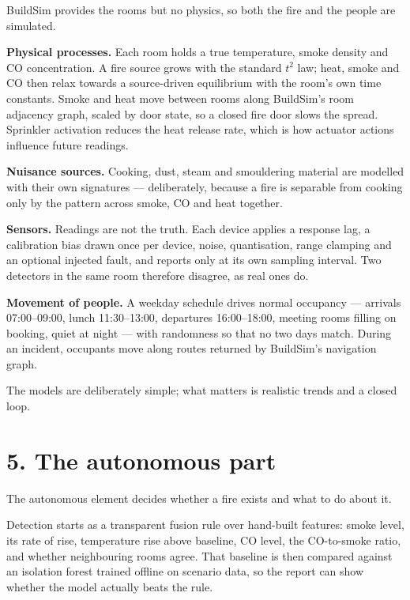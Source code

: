 BuildSim provides the rooms but no physics, so both the fire and the people are
simulated.

\textbf{Physical processes.} Each room holds a true temperature, smoke density and
CO concentration. A fire source grows with the standard $t^2$ law; heat, smoke and
CO then relax towards a source-driven equilibrium with the room's own time
constants. Smoke and heat move between rooms along BuildSim's room adjacency
graph, scaled by door state, so a closed fire door slows the spread. Sprinkler
activation reduces the heat release rate, which is how actuator actions influence
future readings.

\textbf{Nuisance sources.} Cooking, dust, steam and smouldering material are
modelled with their own signatures --- deliberately, because a fire is separable
from cooking only by the pattern across smoke, CO and heat together.

\textbf{Sensors.} Readings are not the truth. Each device applies a response lag, a
calibration bias drawn once per device, noise, quantisation, range clamping and an
optional injected fault, and reports only at its own sampling interval. Two
detectors in the same room therefore disagree, as real ones do.

\textbf{Movement of people.} A weekday schedule drives normal occupancy ---
arrivals 07:00--09:00, lunch 11:30--13:00, departures 16:00--18:00, meeting rooms
filling on booking, quiet at night --- with randomness so that no two days match.
During an incident, occupants move along routes returned by BuildSim's navigation
graph.

The models are deliberately simple; what matters is realistic trends and a closed
loop.

\section{5. The autonomous part}

The autonomous element decides whether a fire exists and what to do about it.

Detection starts as a transparent fusion rule over hand-built features: smoke
level, its rate of rise, temperature rise above baseline, CO level, the
CO-to-smoke ratio, and whether neighbouring rooms agree. That baseline is then
compared against an isolation forest trained offline on scenario data, so the
report can show whether the model actually beats the rule.

